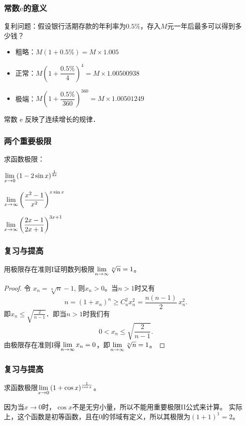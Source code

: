 \documentclass[14pt,notheorems,leqno,xcolor={rgb}]{beamer} %
\begin{document}
\begin{frame}
\frametitle{常数$\mathrm{e}$的意义}
\begin{example*}
复利问题：假设银行活期存款的年利率为$0.5\%$，存入$M$元一年后最多可以得到多少钱？
\end{example*}\pause
\begin{itemize}
  \item 粗略：$M(1+0.5\%)=M\times 1.005$\pause
  \item 正常：$M\left(1+\dfrac{0.5\%}4\right)^4=M \times 1.00500938 $\pause
  \item 极端：$M\left(1+\dfrac{0.5\%}{360}\right)^{360}= M \times 1.00501249$
\end{itemize}\pause
\begin{fact*}
常数 $\mathrm{e}$ 反映了连续增长的规律．
\end{fact*}
\end{frame}

\begin{frame}
\frametitle{两个重要极限}
\begin{review}求函数极限：
\begin{enumlite}
  \item $\lim\limits_{x\to0}\left(1-2\sin x\right)^{\frac1{3x}}$
  \item $\lim\limits_{x\to\infty}\left(\dfrac{x^2-1}{x^2}\right)^{x\sin x}$
  \pause
  \item $\lim\limits_{x\to\infty}\left(\dfrac{2x-1}{2x+1}\right)^{3x+1}$
\end{enumlite}
\end{review}
\end{frame}

\begin{jframe}
\frametitle{复习与提高}
\begin{example}
用极限存在准则I证明数列极限$\lim\limits_{n\to\infty}\sqrt[n]{n}=1$。
\end{example}
\pause
\begin{proof}
令 $x_n=\sqrt[n]{n}-1$, 则$x_n>0$。当$n>1$时又有
\[ n=(1+x_n)^n\ge C_n^2x_n^2 = \frac{n(n-1)}2\,x_n^2. \]
即$x_n\le\sqrt{\frac{2}{n-1}}$．即当$n>1$时我们有
\[ 0 < x_n \le \sqrt{\frac{2}{n-1}}. \]
由极限存在准则I得$\lim\limits_{n\to\infty}x_n=0$，即$\lim\limits_{n\to\infty}\sqrt[n]{n}=1$。
\end{proof}
\end{jframe}

\begin{iframe}
\frametitle{复习与提高}
\begin{example}
求函数极限$\lim\limits_{x\to0}\left(1+\cos x\right)^{\frac1{\cos x}}$。
\end{example}
\pause
\begin{solution}
因为当$x\to0$时，$\cos x$不是无穷小量，所以不能用重要极限II公式来计算。\ppause
实际上，这个函数是初等函数，且在$0$的邻域有定义，所以其极限为$(1+1)^1=2$。
\end{solution}
\end{iframe}
\end{document}
